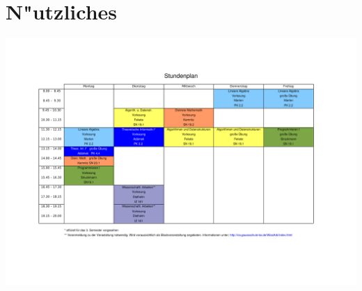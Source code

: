 \section{N"utzliches}



\newpage
\includegraphics[angle=90,totalheight=\textheight,width=1.25\textwidth]
{texte/nuetzliches/stundenplan.pdf}
